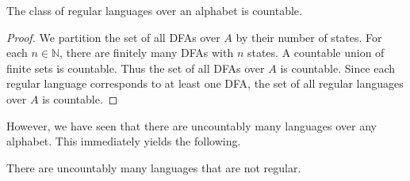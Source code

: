 \begin{theorem*}
    The class of regular languages over an alphabet is countable.
\end{theorem*}
\begin{proof}
    We partition the set of all DFAs over $A$ by their number of states.
    For each $n \in \mathbb{N}$, there are finitely many DFAs with $n$
    states.
    A countable union of finite sets is countable.
    Thus the set of all DFAs over $A$ is countable.
    Since each regular language corresponds to at least one DFA, the set
    of all regular languages over $A$ is countable.
\end{proof}
However, we have seen that there are uncountably many languages over any
alphabet.
This immediately yields the following.
\begin{corollary}
    There are uncountably many languages that are not regular.
\end{corollary}

